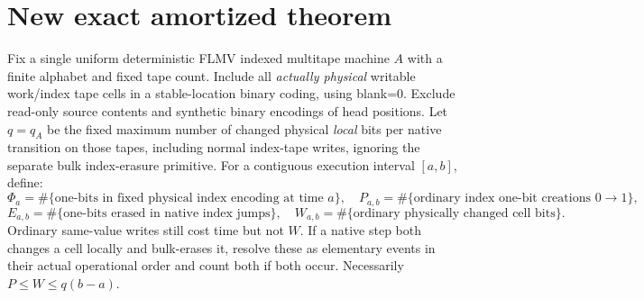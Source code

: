 \documentclass[11pt]{article}
\begin{document}
\section{New exact amortized theorem}
Fix a single uniform deterministic FLMV indexed multitape machine $A$ with a finite alphabet and fixed tape count. Include all \emph{actually physical} writable work/index tape cells in a stable-location binary coding, using blank=0. Exclude read-only source contents and synthetic binary encodings of head positions. Let $q=q_A$ be the fixed maximum number of changed physical \emph{local} bits per native transition on those tapes, including normal index-tape writes, ignoring the separate bulk index-erasure primitive. For a contiguous execution interval $[a,b]$, define:
\[
\Phi_a=\#\{\text{one-bits in fixed physical index encoding at time }a\},
\quad P_{a,b}=\#\{\text{ordinary index one-bit creations }0\to1\},
\]
\[
E_{a,b}=\#\{\text{one-bits erased in native index jumps}\},
\quad
W_{a,b}=\#\{\text{ordinary physically changed cell bits}\}.
\]
Ordinary same-value writes still cost time but not $W$. If a native step both changes a cell locally and bulk-erases it, resolve these as elementary events in their actual operational order and count both if both occur. Necessarily $P\le W\le q(b-a)$.
\end{document}
